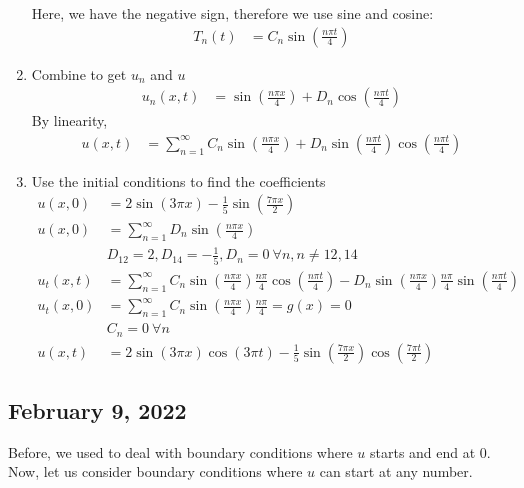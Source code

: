 \begin{enumerate}
  Here, we have the negative sign, therefore we use sine and cosine:
  \begin{align}
    T_n(t) & = C_n \sin \left( \frac{n \pi t}{4} \right)
  \end{align}
  \item Combine to get $u_n$ and $u$
  \begin{align}
    u_n(x, t) & = \sin\left(\frac{n \pi x}{4}\right) + D_n \cos \left( \frac{n \pi t}{4} \right)
  \end{align}
  By linearity,
  \begin{align}
    u(x, t) & = \sum^\infty_{n = 1} C_n \sin\left( \frac{n \pi x}{4} \right) + D_n \sin\left( \frac{n \pi t}{4} \right) \cos\left( \frac{n \pi t}{4} \right)
  \end{align}
  \item Use the initial conditions to find the coefficients
  \begin{align}
    u(x, 0) & = 2 \sin (3 \pi x) - \frac{1}{5} \sin \left( \frac{ 7 \pi x}{2} \right)\\
    u(x, 0) & = \sum^\infty_{n = 1} D_n \sin\left( \frac{n \pi x}{4} \right)\\
    & D_{12} = 2, D_{14} = -\frac{1}{5}, D_n = 0 \ \forall n, n \neq 12, 14\\
    u_t(x, t) & = \sum^\infty_{n = 1} C_n \sin\left( \frac{n \pi x}{4} \right) \frac{n \pi}{4} \cos\left( \frac{n \pi t}{4} \right) - D_n \sin\left( \frac{n \pi x}{4} \right) \frac{n \pi}{4} \sin\left( \frac{n \pi t}{4} \right)\\
    u_t(x, 0) & = \sum^\infty_{n = 1} C_n \sin\left( \frac{n \pi x}{4} \right) \frac{n \pi}{4} = g(x) = 0\\
    & C_n = 0 \ \forall n\\
    u(x, t) & = 2 \sin(3 \pi x) \cos(3 \pi t) - \frac{1}{5} \sin\left( \frac{7 \pi x}{2} \right) \cos\left( \frac{7 \pi t}{2} \right)
  \end{align}
\end{enumerate}

\newpage

\subsection*{February 9, 2022}

Before, we used to deal with boundary conditions where $u$ starts and end at $0$. Now, let us consider boundary conditions where $u$ can start at any number.

